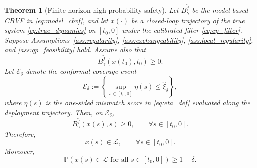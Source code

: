 \documentclass[letterpaper,10pt,conference]{ieeeconf}
\newtheorem{theorem}{Theorem}
\newcommand{\PP}{\mathbb{P}}
\newcommand{\Bm}{B_{\gamma}^{\tilde f}}
\newcommand{\safe}{\mathcal{L}}
\newcommand{\xv}{x}
\begin{document}
\begin{theorem}[Finite-horizon high-probability safety]
\label{thm:main_safety}
Let $\Bm$ be the model-based CBVF in \eqref{eq:model_cbvf}, and let
$\xv(\cdot)$ be a closed-loop trajectory of the true system
\eqref{eq:true_dynamics} on $[t_0,0]$ under the calibrated filter
\eqref{eq:cp_filter}. Suppose Assumptions~\ref{ass:regularity},
\ref{ass:exchangeability}, \ref{ass:local_regularity}, and
\ref{ass:qp_feasibility} hold. Assume also that
\begin{equation}
    \Bm(\xv(t_0),t_0)\ge 0.
    \label{eq:initial_condition}
\end{equation}
Let $\mathcal E_{\delta}$ denote the conformal coverage event
\begin{equation}
    \mathcal E_{\delta}
    :=
    \left\{
    \sup_{s\in[t_0,0]}\eta(s)\le \widehat\xi_{\delta}
    \right\},
    \label{eq:coverage_event}
\end{equation}
where $\eta(s)$ is the one-sided mismatch score in \eqref{eq:eta_def}
evaluated along the deployment trajectory. Then, on
$\mathcal E_{\delta}$,
\begin{equation}
    \Bm(\xv(s),s)\ge 0,
    \qquad \forall s\in[t_0,0].
    \label{eq:cbvf_nonnegative}
\end{equation}
Therefore,
\begin{equation}
    \xv(s)\in\safe,
    \qquad \forall s\in[t_0,0].
    \label{eq:true_safety}
\end{equation}
Moreover,
\begin{equation}
    \PP\!\left(
    \xv(s)\in\safe \text{ for all } s\in[t_0,0]
    \right)
    \ge 1-\delta .
    \label{eq:prob_safe}
\end{equation}
\end{theorem}
\end{document}
